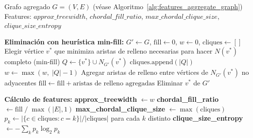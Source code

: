 \begin{algorithm}[H]
\caption{Extracción de features de chordalidad sobre el grafo agregado}
\label{alg:features_chordal}
\begin{algorithmic}[1]
\Require Grafo agregado $G = (V, E)$ (véase Algoritmo~\ref{alg:features_aggregate_graph})
\Ensure  Features: $approx\_treewidth$, $chordal\_fill\_ratio$,
         $max\_chordal\_clique\_size$, $clique\_size\_entropy$

\Statex \textbf{Eliminación con heurística min-fill:}
\State $G' \gets G$, \quad $\text{fill} \gets 0$, \quad $w \gets 0$,
       \quad $\text{cliques} \gets []$
    \State Elegir vértice $v^*$ que minimiza aristas de relleno necesarias
           para hacer $N(v^*)$ completo (min-fill)
    \State $Q \gets \{v^*\} \cup N_{G'}(v^*)$
    \State $\text{cliques}.\text{append}(|Q|)$
    \State $w \gets \max(w,\; |Q| - 1)$
    \State Agregar aristas de relleno entre vértices de $N_{G'}(v^*)$ no adyacentes
    \State $\text{fill} \gets \text{fill} + \text{aristas de relleno agregadas}$
    \State Eliminar $v^*$ de $G'$
\EndWhile

\Statex \textbf{Cálculo de features:}
\State \textbf{approx\_treewidth} $\gets w$
\State \textbf{chordal\_fill\_ratio}
       $\gets \text{fill} \;/\; \max(|E|, 1)$
\State \textbf{max\_chordal\_clique\_size}
       $\gets \max(\text{cliques})$
\State $p_k \gets |\{c \in \text{cliques}: c = k\}| / |\text{cliques}|$
       para cada $k$ distinto
\State \textbf{clique\_size\_entropy}
       $\gets -\sum_k p_k \log_2 p_k$
\end{algorithmic}
\end{algorithm}
